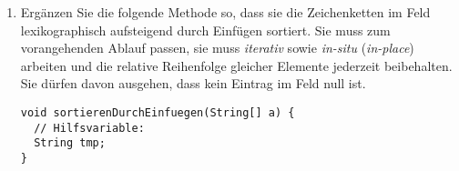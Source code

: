\documentclass{bschlangaul-aufgabe}
\begin{document}
\begin{enumerate}
\begin{liAntwort}
\begin{center}


\end{center}
\end{liAntwort}

\item Ergänzen Sie die folgende Methode
so, dass sie die Zeichenketten im Feld  lexikographisch
aufsteigend durch Einfügen sortiert. Sie muss zum vorangehenden Ablauf
passen, \dh sie muss \emph{iterativ} sowie \emph{in-situ}
(\emph{in-place}) arbeiten und die relative Reihenfolge gleicher
Elemente jederzeit beibehalten. Sie dürfen davon ausgehen, dass kein
Eintrag im Feld null ist.

\begin{verbatim}
void sortierenDurchEinfuegen(String[] a) {
  // Hilfsvariable:
  String tmp;
}
\end{verbatim}

\begin{liAntwort}
\end{liAntwort}
\end{enumerate}
\end{document}
